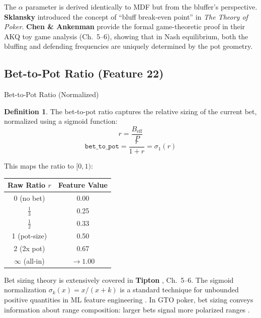\documentclass[11pt, a4paper]{article}
\theoremstyle{definition}
\newtheorem{definition}{Definition}[section]
\newcommand{\feature}[1]{\texttt{#1}}
\begin{document}
\begin{refbox}
The $\alpha$ parameter is derived identically to MDF but from the bluffer's perspective. \textbf{Sklansky} \cite{sklansky1999} introduced the concept of ``bluff break-even point'' in \textit{The Theory of Poker}. \textbf{Chen \& Ankenman} \cite{chen2006} provide the formal game-theoretic proof in their AKQ toy game analysis (Ch.~5--6), showing that in Nash equilibrium, both the bluffing and defending frequencies are uniquely determined by the pot geometry.
\end{refbox}

\subsection{Bet-to-Pot Ratio (Feature 22)}

\begin{featurebox}{Bet-to-Pot Ratio (Normalized)}
\begin{definition}
The bet-to-pot ratio captures the relative sizing of the current bet, normalized using a sigmoid function:
\begin{equation}
    r = \frac{B_{\text{eff}}}{P}
\end{equation}
\begin{equation}
    \feature{bet\_to\_pot} = \frac{r}{1 + r} = \sigma_1(r)
\end{equation}

This maps the ratio to $[0, 1)$:
\begin{center}
\begin{tabular}{cc}
\toprule
Raw Ratio $r$ & Feature Value \\
\midrule
0 (no bet) & 0.00 \\
$\frac{1}{3}$ & 0.25 \\
$\frac{1}{2}$ & 0.33 \\
1 (pot-size) & 0.50 \\
2 (2x pot) & 0.67 \\
$\infty$ (all-in) & $\to 1.00$ \\
\bottomrule
\end{tabular}
\end{center}
\end{definition}
\end{featurebox}

\begin{refbox}
Bet sizing theory is extensively covered in \textbf{Tipton} \cite{tipton2019}, Ch.~5--6. The sigmoid normalization $\sigma_k(x) = x/(x+k)$ is a standard technique for unbounded positive quantities in ML feature engineering \cite{bishop2006}. In GTO poker, bet sizing conveys information about range composition: larger bets signal more polarized ranges \cite{janda2017}.
\end{refbox}
\end{document}
